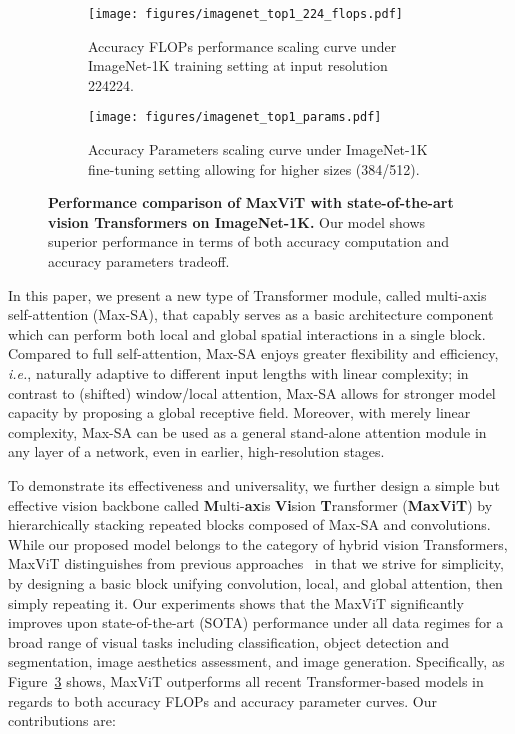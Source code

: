 \documentclass[runningheads]{llncs}
\def\ie{\emph{i.e.}, }
\begin{document}
\begin{figure}[!tb]
 \centering
 \begin{subfigure}[b]{0.49\textwidth}
     \centering
     \texttt{[image: figures/imagenet\_top1\_224\_flops.pdf]}
     \caption{Accuracy \vs FLOPs performance scaling curve under ImageNet-1K training setting at input resolution 224224.}
     \label{fig:imagenet-flops}
 \end{subfigure}
 \hfill
 \begin{subfigure}[b]{0.49\textwidth}
     \centering
     \texttt{[image: figures/imagenet\_top1\_params.pdf]}
     \caption{Accuracy \vs Parameters scaling curve under ImageNet-1K fine-tuning setting allowing for higher sizes (384/512).}
     \label{fig:three sin x}
 \end{subfigure}
\caption{\textbf{Performance comparison of MaxViT with state-of-the-art vision Transformers on ImageNet-1K.} Our model shows superior performance in terms of both accuracy \vs computation and accuracy \vs parameters tradeoff.}
\label{fig:imagenet-1k-main}
\end{figure}

In this paper, we present a new type of Transformer module, called multi-axis self-attention (Max-SA), that capably serves as a basic architecture component which can perform both local and global spatial interactions in a single block.
Compared to full self-attention, Max-SA enjoys greater flexibility and efficiency, \ie naturally adaptive to different input lengths with linear complexity; in contrast to (shifted) window/local attention, Max-SA allows for stronger model capacity by proposing a global receptive field.
Moreover, with merely linear complexity, Max-SA can be used as a general stand-alone attention module in any layer of a network, even in earlier, high-resolution stages.



To demonstrate its effectiveness and universality, we further design a simple but effective vision backbone called \textbf{M}ulti-\textbf{ax}is \textbf{Vi}sion \textbf{T}ransformer (\textbf{MaxViT}) by hierarchically stacking repeated blocks composed of Max-SA and convolutions.
While our proposed model belongs to the category of hybrid vision Transformers, MaxViT distinguishes from previous approaches~\cite{xiao2021early,dai2021coatnet} in that we strive for simplicity, by designing a basic block unifying convolution, local, and global attention, then simply repeating it.
Our experiments shows that the MaxViT significantly improves upon state-of-the-art (SOTA) performance under all data regimes for a broad range of visual tasks including classification, object detection and segmentation, image aesthetics assessment, and image generation.
Specifically, as Figure~\ref{fig:imagenet-1k-main} shows, MaxViT outperforms all recent Transformer-based models in regards to both accuracy \vs FLOPs and accuracy \vs parameter curves. Our contributions are:
\end{document}
